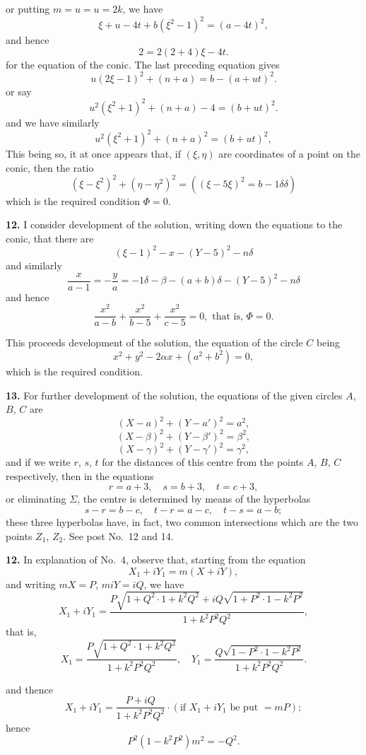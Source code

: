 \documentclass[11pt,a4paper]{article}
\begin{document}
or putting $m = u = u = 2k$, we have
\[
\xi + u - 4t + b(\xi^2 - 1)^2 = (a - 4t)^2,
\]
and hence
\[
2 = 2(2 + 4)\xi - 4t.
\]
for the equation of the conic. The last preceding equation gives
\[
u(2\xi - 1)^2 + (n + a) = b - (a + ut)^2.
\]
or say
\[
u^2(\xi^2 + 1)^2 + (n + a) - 4 = (b + ut)^2.
\]
and we have similarly
\[
u^2(\xi^2 + 1)^2 + (n + a)^2 = (b + ut)^2,
\]
This being so, it at once appears that, if $(\xi, \eta)$ are coordinates of a point on the conic, then the ratio
\[
(\xi - \xi^2)^2 + (\eta - \eta^2)^2 = ((\xi - 5\xi)^2 = b - 1\delta\delta)
\]
which is the required condition $\Phi = 0$.

\textbf{12.} I consider development of the solution, writing down the equations to the conic, that there are
\[
(\xi - 1)^2 - x - (Y - 5)^2 - n\delta
\]
and similarly
\[
\frac{x}{a - 1} = - \frac{y}{a} = -1\delta - \beta - (a + b)\delta - (Y - 5)^2 - n\delta
\]
and hence
\[
\frac{x^2}{a - b} + \frac{x^2}{b - 5} + \frac{x^2}{c - 5} = 0, \text{ that is, } \Phi = 0.
\]

This proceeds development of the solution, the equation of the circle $C$ being
\[
x^2 + y^2 - 2\alpha x + (a^2 + b^2) = 0,
\]
which is the required condition.

\textbf{13.} For further development of the solution, the equations of the given circles $A$, $B$, $C$ are
\[
(X - a)^2 + (Y - a')^2 = a^2,
\]
\[
(X - \beta)^2 + (Y - \beta')^2 = \beta^2,
\]
\[
(X - \gamma)^2 + (Y - \gamma')^2 = \gamma^2,
\]
and if we write $r$, $s$, $t$ for the distances of this centre from the points $A$, $B$, $C$ respectively, then in the equations
\[
r = a + 3, \quad s = b + 3, \quad t = c + 3,
\]
or eliminating $\Sigma$, the centre is determined by means of the hyperbolas
\[
s - r = b - c, \quad t - r = a - c, \quad t - s = a - b;
\]
these three hyperbolas have, in fact, two common intersections which are the two points $Z_1$, $Z_2$. See post No.\ 12 and 14.

\textbf{12.} In explanation of No.\ 4, observe that, starting from the equation
\[
X_1 + iY_1 = m(X + iY),
\]
and writing $m X = P$, $m i Y = iQ$, we have
\[
X_1 + iY_1 = \frac{P\sqrt{1 + Q^2 \cdot 1 + k^2 Q^2} + iQ\sqrt{1 + P^2 \cdot 1 - k^2 P^2}}{1 + k^2 P^2 Q^2},
\]
that is,
\[
X_1 = \frac{P \sqrt{1 + Q^2 \cdot 1 + k^2 Q^2}}{1 + k^2 P^2 Q^2}, \quad Y_1 = \frac{Q \sqrt{1 - P^2 \cdot 1 - k^2 P^2}}{1 + k^2 P^2 Q^2}.
\]

and thence
\[
X_1 + iY_1 = \frac{P + iQ}{1 + k^2 P^2 Q^2} \cdot (\text{if } X_1 + iY_1 \text{ be put } = mP);
\]
hence
\[
P^2 (1 - k^2 P^2) m^2 = -Q^2.
\]
\end{document}

